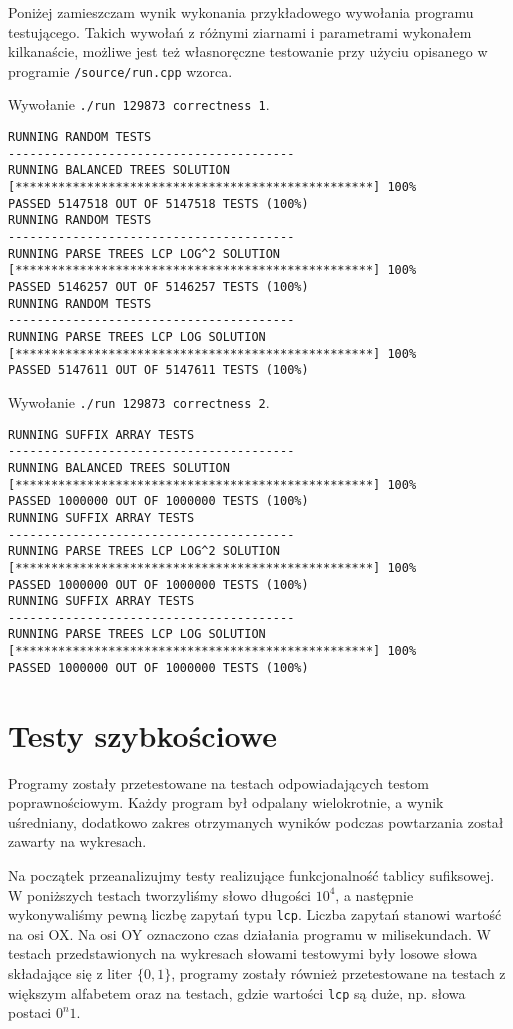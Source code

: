 \documentclass[declaration,shortabstract]{iithesis}
\theoremstyle{definition} \newtheorem{definition}{Definicja}[chapter]
\theoremstyle{plain} \newtheorem{remark}[definition]{Obserwacja}
\theoremstyle{plain} \newtheorem{theorem}[definition]{Twierdzenie}
\theoremstyle{plain} \newtheorem{example}{Przykład}[definition]
\theoremstyle{plain} \newtheorem{lemma}[definition]{Lemat}
\begin{document}
Poniżej zamieszczam wynik wykonania przykładowego wywołania programu testującego. Takich wywołań z różnymi ziarnami i parametrami wykonałem kilkanaście, możliwe jest też własnoręczne testowanie przy użyciu opisanego w programie \texttt{/source/run.cpp} wzorca.

\noindent
Wywołanie \texttt{./run 129873 correctness 1}.

\begin{lstlisting}[basicstyle=\tiny,frame=single]
RUNNING RANDOM TESTS
----------------------------------------
RUNNING BALANCED TREES SOLUTION
[**************************************************] 100%
PASSED 5147518 OUT OF 5147518 TESTS (100%)
RUNNING RANDOM TESTS
----------------------------------------
RUNNING PARSE TREES LCP LOG^2 SOLUTION
[**************************************************] 100%
PASSED 5146257 OUT OF 5146257 TESTS (100%)
RUNNING RANDOM TESTS
----------------------------------------
RUNNING PARSE TREES LCP LOG SOLUTION
[**************************************************] 100%
PASSED 5147611 OUT OF 5147611 TESTS (100%)
\end{lstlisting}

\noindent
Wywołanie \texttt{./run 129873 correctness 2}.

\begin{lstlisting}[basicstyle=\tiny,frame=single]
RUNNING SUFFIX ARRAY TESTS
----------------------------------------
RUNNING BALANCED TREES SOLUTION
[**************************************************] 100%
PASSED 1000000 OUT OF 1000000 TESTS (100%)
RUNNING SUFFIX ARRAY TESTS
----------------------------------------
RUNNING PARSE TREES LCP LOG^2 SOLUTION
[**************************************************] 100%
PASSED 1000000 OUT OF 1000000 TESTS (100%)
RUNNING SUFFIX ARRAY TESTS
----------------------------------------
RUNNING PARSE TREES LCP LOG SOLUTION
[**************************************************] 100%
PASSED 1000000 OUT OF 1000000 TESTS (100%)    
\end{lstlisting}

\section{Testy szybkościowe}

Programy zostały przetestowane na testach odpowiadających testom poprawnościowym. Każdy program był odpalany wielokrotnie, a wynik uśredniany, dodatkowo zakres otrzymanych wyników podczas powtarzania został zawarty na wykresach.

Na początek przeanalizujmy testy realizujące funkcjonalność tablicy sufiksowej. W poniższych testach tworzyliśmy słowo długości $10^4$, a następnie wykonywaliśmy pewną liczbę zapytań typu \texttt{lcp}. Liczba zapytań stanowi wartość na osi OX. Na osi OY oznaczono czas działania programu w milisekundach. W testach przedstawionych na wykresach słowami testowymi były losowe słowa składające się z liter $\{0, 1\}$, programy zostały również przetestowane na testach z większym alfabetem oraz na testach, gdzie wartości \texttt{lcp} są duże, np. słowa postaci $0^n1$.
\end{document}
